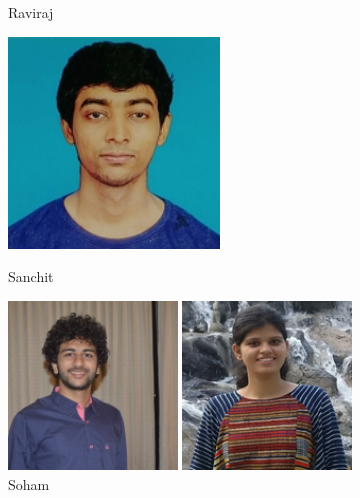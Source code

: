\begin{frame}
\begin{figure}[ht]
\begin{minipage}[b]{0.23\linewidth}
            \caption{Raviraj}   
            \label{fig:b}
        \end{minipage}
        \begin{minipage}[b]{0.23\linewidth}
            \centering
            \includegraphics[width=0.5\textwidth]{ta_images/sanchit.jpg}
            \caption{ Sanchit}
            \label{fig:b}
        \end{minipage}
        \begin{minipage}[b]{0.23\linewidth}
            \centering
            \includegraphics[width=0.4\textwidth]{ta_images/soham.jpg}
            \caption{Soham}
            \label{fig:c}
        \end{minipage}      
        \begin{minipage}[b]{0.23\linewidth}
            \centering
            \includegraphics[width=0.4\textwidth]{ta_images/shweta}

\end{minipage}
\end{figure}
\end{frame}
